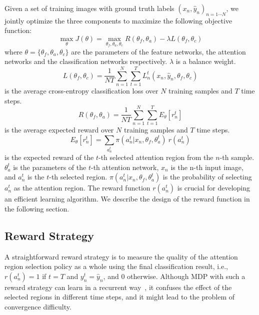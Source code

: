 \documentclass[10pt,twocolumn,letterpaper]{article}
\begin{document}
Given a set of training images with ground truth labels $(x_n, \hat{y}_n)_{n=1\cdots N}$, we jointly optimize the three components to maximize the following objective function:
\begin{equation}
\max_{\theta} J(\theta) =  \max_{\theta_f, \theta_a, \theta_c} R(\theta_f, \theta_a) - \lambda L(\theta_f, \theta_c)
\end{equation}
where $\theta = \{\theta_f, \theta_a, \theta_c\}$ are the parameters of the feature networks, the attention networks and the classification networks respectively.
$\lambda$ is a balance weight.
\begin{equation}
L(\theta_f, \theta_c) = \frac{1}{NT} \sum_{n=1}^N \sum_{t=1}^T L^t_n(x_n, \hat{y}_n, \theta_f, \theta_c)
\end{equation}
is the average cross-entropy classification loss over $N$ training samples and $T$ time steps.
\begin{equation}
R(\theta_f, \theta_a) = \frac{1}{NT} \sum_{n=1}^N \sum_{t=1}^T E_{\theta}[r^t_n]
\end{equation}
is the average expected reward over $N$ training samples and $T$ time steps.
\begin{equation}
E_{\theta}[r^t_n] = \sum_{a^t_n} \pi(a^t_n|x_n, \theta_f, \theta^t_a) \ r(a^t_n)
\end{equation}
is the expected reward of the $t$-th selected attention region from the $n$-th sample.
$\theta^t_a$ is the parameters of the $t$-th attention network,
$x_n$ is the n-th input image, and $a^t_n$ is the $t$-th selected region.
$\pi(a^t_n|x_n, \theta_f, \theta^t_a)$ is the probability of selecting $a^t_n$ as the attention region.
The reward function $r(a^t_n)$ is crucial for developing an efficient learning algorithm. We describe the design of the reward function in the following section.

\subsection{Reward Strategy} \label{sec: reward}

A straightforward reward strategy is to measure the quality of the attention region selection policy as a whole using the final classification result, i.e., $r(a^t_n) = 1$ if $t=T$ and $y^t_n=\hat{y}_n$, and 0 otherwise.
Although MDP with such a reward strategy can learn in a recurrent way~\cite{bd1}, it confuses the effect of the selected regions in different time steps,
and it might lead to the problem of convergence difficulty.
\end{document}
